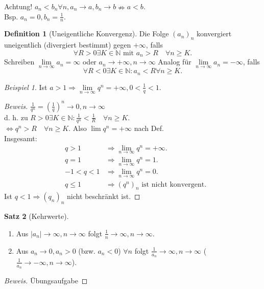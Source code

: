 \documentclass[12pt,a4paper,titlepage]{article} %
\theoremstyle{definition}
\newtheorem{satz}{Satz}[subsection]
\newtheorem{defi}[satz]{Definition}
\theoremstyle{remark}
\newtheorem*{bsp}{Beispiel}
\newenvironment{bew}{\begin{proof}[Beweis]}{\end{proof}}
\newcommand{\N}{\mathbb{N}}
\begin{document}
Achtung! \(a_n < b_n \forall n, a_n \rightarrow a, b_n \rightarrow b \nRightarrow  a<b.\)\\Bsp. \(a_n = 0, b_n = \frac{1}{n}\).
\begin{defi}[Uneigentliche Konvergenz]
	Die Folge \((a_n)_n\) konvergiert uneigentlich (divergiert bestimmt) gegen \(+\infty\), falls 
	\[ \forall R>0 \exists K\in\N \text{ mit } a_n >R \quad \forall n\geq K. \]
	Schreiben \( \lim\limits_{n\rightarrow\infty} a_n = \infty \) oder \( a_n \rightarrow +\infty, n\rightarrow \infty \)
	Analog für \( \lim\limits_{n\rightarrow\infty} a_n = -\infty \), falls 
	\[ \forall R<0 \exists K\in\N: a_n < R \forall n\geq K. \]
\end{defi}
\begin{bsp}
	Ist \(a>1 \Rightarrow \lim\limits_{n\rightarrow\infty}q^n = +\infty, 0< \frac{1}{q} < 1. \)
\end{bsp}
\begin{bew}
	\(\frac{1}{q^n} = \left( \frac{1}{q} \right)^n \rightarrow 0, n\rightarrow \infty  \)\\
	d. h. zu \(R>0 \exists K\in\N: \frac{1}{q^n} < \frac{1}{R} \quad \forall n\geq K. \)\\
	\( \Leftrightarrow q^n > R \quad \forall n\geq K. \) Also \(\lim q^n = +\infty \) nach Def.\\
	Insgesamt: 
	\begin{align*}
		&q>1 &\Rightarrow \lim\limits_{n\rightarrow\infty}q^n = +\infty.\\
		&q=1 &\Rightarrow \lim\limits_{n\rightarrow\infty}q^n = 1.\\
		&-1<q<1 & \Rightarrow \lim\limits_{n\rightarrow\infty} q^n = 0.\\
		&q\leq 1 & \Rightarrow (q^n)_n \text{ ist nicht konvergent.}
	\end{align*}
	Ist \( q<1 \Rightarrow (q_n)_n \) nicht beschränkt ist.
\end{bew}
\begin{satz}[Kehrwerte]
	\begin{enumerate}
		\item Aus \( |a_n| \rightarrow \infty, n\rightarrow\infty \) folgt \(\frac{1}{n} \rightarrow\infty,n\rightarrow\infty \).
		\item Aus \( a_n\rightarrow 0, a_n > 0 \) (bzw. \(a_n<0\)) \( \forall n \) folgt \( \frac{1}{a_n} \rightarrow\infty, n\rightarrow\infty \) (\( \frac{1}{a_n} \rightarrow -\infty, n\rightarrow\infty \)).
	\end{enumerate}
\end{satz}
\begin{bew}
	Übungsaufgabe
\end{bew}
\end{document}
